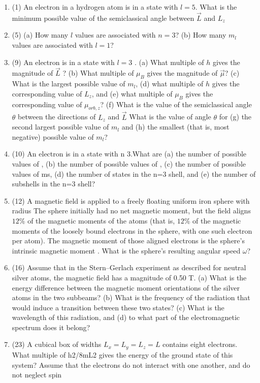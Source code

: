 \documentclass[fleqn]{article}
\begin{document}
  \begin{enumerate}
    \item (1) An electron in a hydrogen atom is in a state with $l=5$. What is the minimum possible value of the semiclassical angle between $\overrightarrow{L}$ and $L_z$
    \item (5) (a) How many $l$ values are associated with $n=3$? (b) How many $m_l$ values are associated with $l=1$?
    \item (9) An electron is in a state with $l=3$ . (a) What multiple of $h$ gives the magnitude of $\overrightarrow{L}$ ? (b) What multiple of $\mu_B$ gives the magnitude of $\overrightarrow{\mu}$? (c) What is the largest possible value of $m_l$, (d) what multiple of $h$ gives the corresponding value of $L_z$, and (e) what multiple of $\mu_B$ gives the corresponding value of $\mu_{orb,z}$? (f) What is the value of the semiclassical angle $\theta$ between the directions of $L_z$ and $\overrightarrow{L}$ What is the value of angle $\theta$ for (g) the second largest possible value of $m_l$ and (h) the smallest (that is, most negative) possible value of $m_l$?
    \item (10) An electron is in a state with n  3.What are (a) the number of possible values of , (b) the number of possible values of , (c) the number of possible values of ms, (d) the number of states in the n=3 shell, and (e) the number of subshells in the n=3 shell?
    \item (12) A magnetic field is applied to a freely floating uniform
    iron sphere with radius The sphere initially had no
    net magnetic moment, but the field aligns $12\%$ of the magnetic moments of the atoms (that is, $12\%$ of the magnetic moments of the
    loosely bound electrons in the sphere, with one such electron per
    atom). The magnetic moment of those aligned electrons is the
    sphere’s intrinsic magnetic moment . What is the sphere’s resulting angular speed $\omega$?
    \item (16) Assume that in the Stern–Gerlach experiment as described for
    neutral silver atoms, the magnetic field has a magnitude of 0.50 T.
    (a) What is the energy difference between the magnetic moment orientations of the silver atoms in the two subbeams? (b) What is the
    frequency of the radiation that would induce a transition between
    these two states? (c) What is the wavelength of this radiation, and (d)
    to what part of the electromagnetic spectrum does it belong?
    \item (23) A cubical box of widths $L_x=L_y=L_z=L$ contains eight electrons. What multiple of h2/8mL2 gives the energy of the ground state of this system? Assume that the electrons do not interact with one another, and do not neglect spin
  \end{enumerate}
\end{document}
